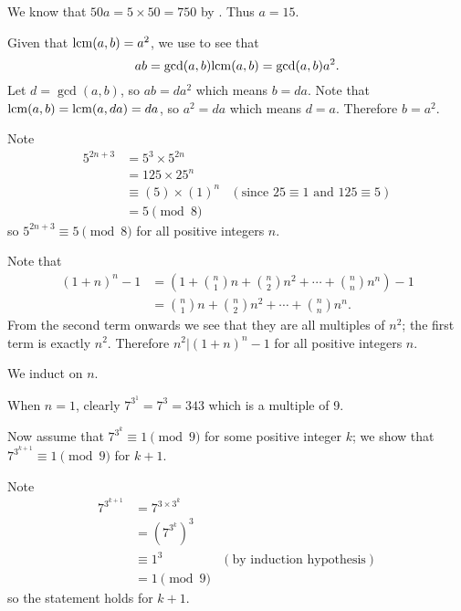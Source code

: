 \begin{questions}
    \item We know that $50a = 5 \times 50 = 750$ by . Thus $a = 15$.

    \item Given that $\mathrm{lcm}(a,b) = a^2$, we use  to see that
    \[
        ab = \gcd(a,b)\mathrm{lcm}(a,b) = \gcd(a,b)a^2.
    \]
    Let $d = \gcd(a,b)$, so $ab = da^2$ which means $b = da$. Note that $\mathrm{lcm}(a,b) = \mathrm{lcm}(a, da) = da$, so $a^2 = da$ which means $d = a$. Therefore $b = a^2$.

    \item Note
    \begin{align*}
        5^{2n+3} &= 5^3 \times 5^{2n}\\
        &= 125 \times 25^n \\
        &\equiv (5) \times (1)^n & (\text{since } 25 \equiv 1 \text{ and } 125 \equiv 5)\\
        &= 5 \pmod8
    \end{align*}
    so $5^{2n+3} \equiv 5 \pmod8$ for all positive integers $n$.

    \item Note that
    \begin{align*}
        (1+n)^n - 1 &= \left(1 + {n \choose 1}n + {n \choose 2}n^2 + \cdots + {n \choose n}n^n\right) - 1\\
        &= {n \choose 1}n + {n \choose 2}n^2 + \cdots + {n \choose n}n^n.
    \end{align*}
    From the second term onwards we see that they are all multiples of $n^2$; the first term is exactly $n^2$. Therefore $n^2 \vert (1+n)^n - 1$ for all positive integers $n$.

    \item We induct on $n$.

    When $n = 1$, clearly $7^{3^1} = 7^3 = 343$ which is a multiple of 9.

    Now assume that $7^{3^k} \equiv 1 \pmod9$ for some positive integer $k$; we show that $7^{3^{k+1}} \equiv 1 \pmod9$ for $k + 1$.

    Note
    \begin{align*}
        7^{3^{k+1}} &= 7^{3\times3^k}\\
        &= \left(7^{3^k}\right)^3\\
        &\equiv 1^3 & (\text{by induction hypothesis})\\
        &= 1 \pmod9
    \end{align*}
    so the statement holds for $k+1$.


\end{questions}

